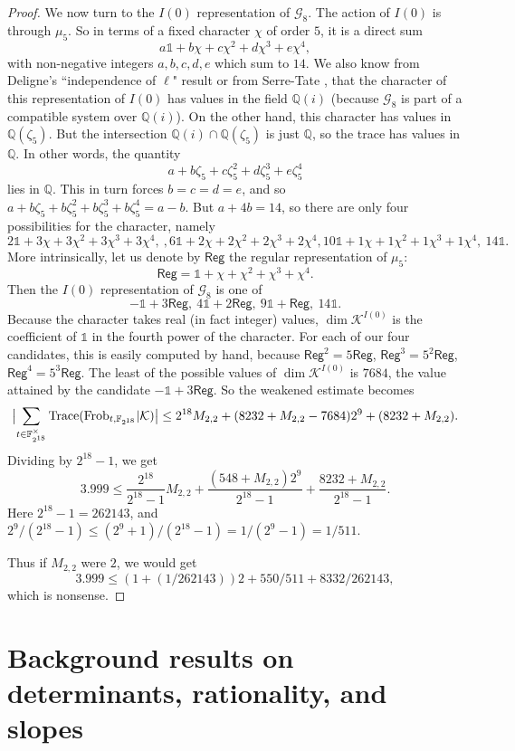 \documentclass[11pt]{amsart}
\theoremstyle{plain}
\theoremstyle{definition}
\numberwithin{thm}{section}
\numberwithin{equation}{thm}
\newcommand{\Trace}{{\rm Trace}}
\newcommand{\Reg}{\mathsf {Reg}}
\newcommand{\sG}{{\mathcal G}}
\newcommand{\sK}{{\mathcal K}}
\newcommand{\F}{{\mathbb F}}
\newcommand{\Q}{{\mathbb Q}}
\newcommand{\0}{\emptyset}
\newcommand{\triv}{{\mathds{1}}}
\newcommand{\Frob}{\mathrm{Frob}}
\begin{document}
\begin{proof}
 We now turn to the  $I(0)$ representation of $\sG_8$. The action of $I(0)$ is through $\mu_5$.  So in terms of a fixed character $\chi$ of order $5$, it is a direct sum
 $$a\triv +b\chi +c\chi^2 +d\chi^3 +e\chi^4,$$
 with non-negative integers $a,b,c,d,e$ which sum to $14$. We also know from Deligne's ``independence of $\ell$" result \cite[Theorem 9.8]{De-Const} or from Serre-Tate \cite[Theorem 2(ii)]{Se-Ta},  that the character of this representation of $I(0)$ has values in the field $\Q(i)$ (because $\sG_8$ is part of a compatible system over $\Q(i)$). On the other hand, this character has values in $\Q(\zeta_5)$. But the intersection $\Q(i)\cap \Q(\zeta_5)$ is just $\Q$, so the trace has values in $\Q$. In other words, the quantity 
 $$a +b\zeta_5 +c\zeta_5^2 +d\zeta_5^3 +e\zeta_5^4$$
 lies in $\Q$. This in turn forces $b=c=d=e$, and so  $a +b\zeta_5 +b\zeta_5^2 +b\zeta_5^3 +b\zeta_5^4=a-b$. But $a+4b=14$, so there are only  four possibilities for the character, namely
 $$2\triv +3\chi +3\chi^2 +3\chi^3 +3\chi^4,\ ,6\triv +2\chi +2\chi^2 +2\chi^3 +2\chi^4, 10\triv +1\chi +1\chi^2 +1\chi^3 +1\chi^4, \ 14\triv.$$
 More intrinsically, let us denote by $\Reg$ the regular representation of $\mu_5$:
 $$\Reg =\triv +\chi +\chi^2 +\chi^3 +\chi^4.$$
 Then  the  $I(0)$ representation of $\sG_8$ is one of
 $$-\triv +3\Reg, \ 4\triv+2\Reg, \ 9\triv+\Reg, \ 14\triv.$$
 Because the character takes real (in fact integer) values, 
 $\dim \sK^{I(0)}$ is the coefficient of $\triv$ in the fourth power of the character. For each of our four candidates, this is easily computed by hand, because $\Reg^2=5\Reg$, $\Reg^3=5^2\Reg$, $\Reg^4=5^3\Reg$. The least of the possible values of  $\dim \sK^{I(0)}$ is $7684$, the value attained by the candidate $-\triv +3\Reg$.
 So the weakened estimate becomes
 $$\bigl{|}\sum_{t \in \F_{2^{18}}^\times}\Trace(\Frob_{t,\F_{2^{18}}}|\sK)\bigr{|} \le 2^{18}M_{2,2} + (8232 +M_{2,2} -7684)2^9 +(8232 +M_{2,2}).$$
 Dividing by $2^{18}-1$, we get
 $$3.999 \le \frac{2^{18}}{2^{18}-1}M_{2,2} + \frac{(548+M_{2,2})2^9}{2^{18}-1} + \frac{8232 +M_{2,2}}{2^{18}-1}.$$
 Here $2^{18}-1=262143$, and $2^9/(2^{18}-1) \le (2^9+1)/(2^{18}-1)=1/(2^9-1) =1/511$. 
 
 Thus if $M_{2,2}$ were $2$, we would get
 $$3.999 \le (1 + (1/262143))2 +550/511 + 8332/262143,$$
 which is nonsense. 
\end{proof}

\section{Background results on determinants, rationality, and slopes}
\end{document}
